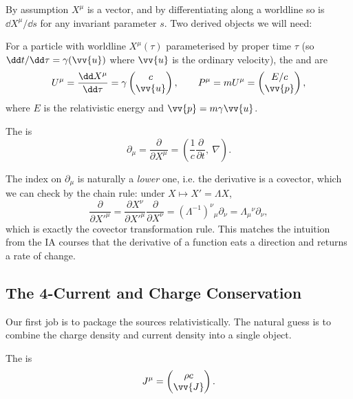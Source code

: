By assumption $X^\mu$ is a vector, and by differentiating along a worldline so is $\dd X^\mu/\dd s$ for any invariant parameter $s$. Two derived objects we will need:

\begin{definition}
	For a particle with worldline $X^\mu(\tau)$ parameterised by proper time $\tau$ (so $\dd t/\dd \tau = \gamma(\vv{u})$ where $\vv{u}$ is the ordinary velocity), the  and  are
	$$
	U^\mu = \frac{\dd X^\mu}{\dd \tau} = \gamma \begin{pmatrix} c \\ \vv{u}\end{pmatrix}, \qquad P^\mu = m U^\mu = \begin{pmatrix} E/c\\ \vv{p}\end{pmatrix},
	$$
	where $E$ is the relativistic energy and $\vv{p} = m\gamma\vv{u}$.
\end{definition}

\begin{definition}[4-derivative]
	The  is
	$$
	\partial_\mu = \frac{\partial}{\partial X^\mu} = \left(\frac{1}{c}\frac{\partial}{\partial t},\ \nabla\right).
	$$
\end{definition}

The index on $\partial_\mu$ is naturally a \emph{lower} one, i.e. the derivative is a covector, which we can check by the chain rule: under $X\mapsto X' = \Lambda X$,
$$
\frac{\partial}{\partial X'^\mu} = \frac{\partial X^\nu}{\partial X'^\mu}\frac{\partial}{\partial X^\nu} = (\Lambda^{-1})^\nu{}_\mu \partial_\nu = \Lambda_\mu{}^\nu\partial_\nu,
$$
which is exactly the covector transformation rule. This matches the intuition from the IA courses that the derivative of a function eats a direction and returns a rate of change.

\subsection{The 4-Current and Charge Conservation}

Our first job is to package the sources relativistically. The natural guess is to combine the charge density and current density into a single object.

\begin{definition}[4-current]
	The  is
	$$
	J^\mu = \begin{pmatrix} \rho c\\ \vv{J}\end{pmatrix}.
	$$
\end{definition}


